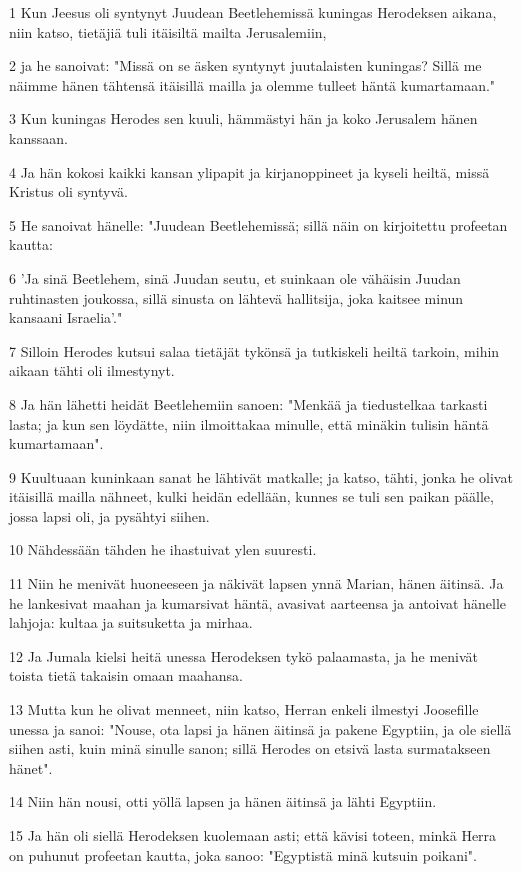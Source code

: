 \par 1 Kun Jeesus oli syntynyt Juudean Beetlehemissä kuningas Herodeksen aikana, niin katso, tietäjiä tuli itäisiltä mailta Jerusalemiin,
\par 2 ja he sanoivat: "Missä on se äsken syntynyt juutalaisten kuningas? Sillä me näimme hänen tähtensä itäisillä mailla ja olemme tulleet häntä kumartamaan."
\par 3 Kun kuningas Herodes sen kuuli, hämmästyi hän ja koko Jerusalem hänen kanssaan.
\par 4 Ja hän kokosi kaikki kansan ylipapit ja kirjanoppineet ja kyseli heiltä, missä Kristus oli syntyvä.
\par 5 He sanoivat hänelle: "Juudean Beetlehemissä; sillä näin on kirjoitettu profeetan kautta:
\par 6 'Ja sinä Beetlehem, sinä Juudan seutu, et suinkaan ole vähäisin Juudan ruhtinasten joukossa, sillä sinusta on lähtevä hallitsija, joka kaitsee minun kansaani Israelia'."
\par 7 Silloin Herodes kutsui salaa tietäjät tykönsä ja tutkiskeli heiltä tarkoin, mihin aikaan tähti oli ilmestynyt.
\par 8 Ja hän lähetti heidät Beetlehemiin sanoen: "Menkää ja tiedustelkaa tarkasti lasta; ja kun sen löydätte, niin ilmoittakaa minulle, että minäkin tulisin häntä kumartamaan".
\par 9 Kuultuaan kuninkaan sanat he lähtivät matkalle; ja katso, tähti, jonka he olivat itäisillä mailla nähneet, kulki heidän edellään, kunnes se tuli sen paikan päälle, jossa lapsi oli, ja pysähtyi siihen.
\par 10 Nähdessään tähden he ihastuivat ylen suuresti.
\par 11 Niin he menivät huoneeseen ja näkivät lapsen ynnä Marian, hänen äitinsä. Ja he lankesivat maahan ja kumarsivat häntä, avasivat aarteensa ja antoivat hänelle lahjoja: kultaa ja suitsuketta ja mirhaa.
\par 12 Ja Jumala kielsi heitä unessa Herodeksen tykö palaamasta, ja he menivät toista tietä takaisin omaan maahansa.
\par 13 Mutta kun he olivat menneet, niin katso, Herran enkeli ilmestyi Joosefille unessa ja sanoi: "Nouse, ota lapsi ja hänen äitinsä ja pakene Egyptiin, ja ole siellä siihen asti, kuin minä sinulle sanon; sillä Herodes on etsivä lasta surmatakseen hänet".
\par 14 Niin hän nousi, otti yöllä lapsen ja hänen äitinsä ja lähti Egyptiin.
\par 15 Ja hän oli siellä Herodeksen kuolemaan asti; että kävisi toteen, minkä Herra on puhunut profeetan kautta, joka sanoo: "Egyptistä minä kutsuin poikani".
